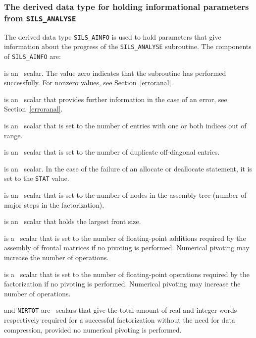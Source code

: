 \documentclass{galahad}
\newcommand{\packagename}{SILS}
\begin{document}

\subsubsection{The derived data type for holding informational
 parameters from {\tt \packagename\_ANALYSE}}\label{typeinfoa}
The derived data type
{\tt \packagename\_AINFO}
is used to hold parameters that give information about the progress of the
{\tt \packagename\_AN\-ALYSE} subroutine. The components of
{\tt \packagename\_AINFO}
are:

\begin{description}

 is an \integer\ scalar. The value
 zero indicates that the subroutine has performed
 successfully.  For nonzero values, see Section~\ref{erroranal}.

 is an \integer\ scalar that provides further information in the
case of an error, see Section~\ref{erroranal}.

 is an \integer\ scalar that is set to the number of
entries with one or both indices out of range.

 is an \integer\ scalar that is set to the number of
duplicate off-diagonal entries.

 is an \integer\ scalar. In the case of the failure of an
allocate or deallocate statement, it is set to the {\tt STAT} value.

 is an \integer\ scalar that is set to the number of
 nodes in the assembly tree (number of major steps in the
 factorization).

  is an \integer\ scalar that holds the largest front size.

 is a \realdp\ scalar that is set to the number of
 floating-point additions required by the assembly of frontal
 matrices if no pivoting
 is performed.  Numerical pivoting may increase the number of
 operations.

 is a \realdp\ scalar that is set to the number of
 floating-point operations required by the factorization if no pivoting
 is performed.  Numerical pivoting may increase the number of
 operations.

 and {\tt NIRTOT} are \integer\ scalars that give the total
 amount of real and integer words respectively required for a
 successful factorization without the need for data compression,
 provided no numerical pivoting is performed.


\end{description}
\end{document}
